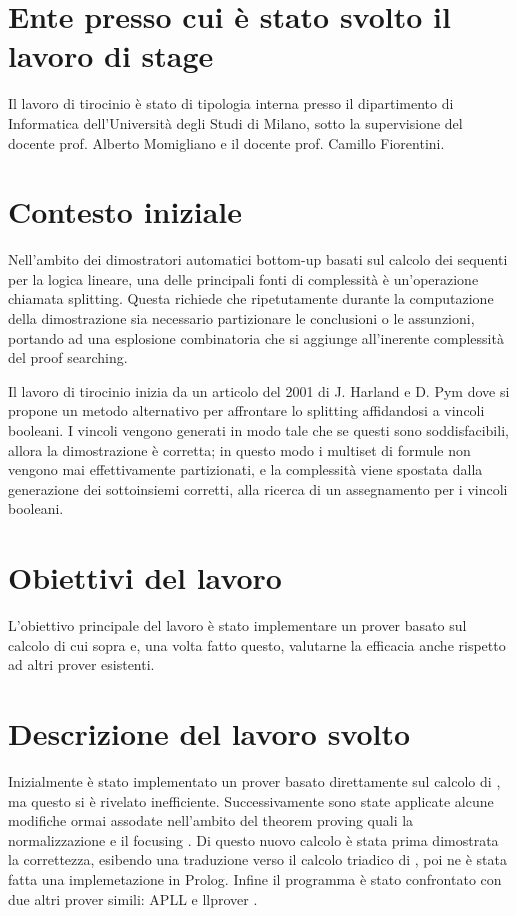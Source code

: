 \documentclass[a4paper, 12pt, italian]{article}
\begin{document}
\section{Ente presso cui è stato svolto il lavoro di stage}
Il lavoro di tirocinio è stato di tipologia interna presso il dipartimento di Informatica dell'Università degli Studi di Milano, sotto la supervisione del docente prof. Alberto Momigliano e il docente prof. Camillo Fiorentini.

\section{Contesto iniziale}
Nell'ambito dei dimostratori automatici bottom-up basati sul calcolo dei sequenti per la logica lineare, una delle principali fonti di complessità è un'operazione chiamata splitting.
Questa richiede che ripetutamente durante la computazione della dimostrazione sia necessario partizionare le conclusioni o le assunzioni, portando ad una esplosione combinatoria che si aggiunge all'inerente complessità del proof searching.

Il lavoro di tirocinio inizia da un articolo del 2001 di J. Harland e D. Pym \cite{HarlandPym} dove si propone un metodo alternativo per affrontare lo splitting affidandosi a vincoli booleani.
I vincoli vengono generati in modo tale che se questi sono soddisfacibili, allora la dimostrazione è corretta;
in questo modo i multiset di formule non vengono mai effettivamente partizionati, e la complessità viene spostata dalla generazione dei sottoinsiemi corretti, alla ricerca di un assegnamento per i vincoli booleani.

\section{Obiettivi del lavoro}
L'obiettivo principale del lavoro è stato implementare un prover basato sul calcolo di cui sopra e, una volta fatto questo, valutarne la efficacia anche rispetto ad altri prover esistenti.

\section{Descrizione del lavoro svolto}
Inizialmente è stato implementato un prover basato direttamente sul calcolo di \cite{HarlandPym}, ma questo si è rivelato inefficiente.
Successivamente sono state applicate alcune modifiche ormai assodate nell'ambito del theorem proving quali la normalizzazione e il focusing \cite{Focusing}.
Di questo nuovo calcolo è stata prima dimostrata la correttezza, esibendo una traduzione verso il calcolo triadico di \cite{Focusing}, poi ne è stata fatta una implemetazione in Prolog.
Infine il programma è stato confrontato con due altri prover simili: APLL \cite{APLL} e llprover \cite{llprover}.
\end{document}
